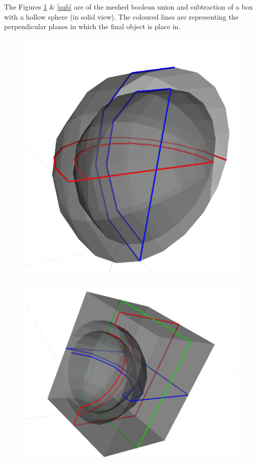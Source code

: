\documentclass[12pt,a4paper]{article}
\begin{document}
\noindent The Figures \ref{uni} \& \ref{sub} are of the meshed boolean union and subtraction of a box with a hollow sphere (in solid view). The coloured lines are representing the perpendicular planes in which the final object is place in. 

\begin{figure}[h!]
\centering
\begin{minipage}{.4\textwidth}
  \centering
  \includegraphics[height=1\linewidth]{Images//Booleans/SphereUnion.png}
  \label{uni}
\end{minipage}%
\begin{minipage}{.4\textwidth}
  \centering
  \includegraphics[height=1\linewidth]{Images//Booleans//SphereSubtraction.png}

\end{minipage}
\end{figure}
\end{document}
